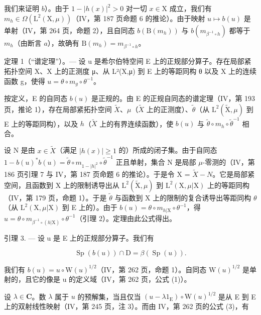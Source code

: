 我们来证明 \(b\)）。由于 \(1 - |h(x)|^2 > 0\) 对一切 \(x \in \mathrm{X}\) 成立，我们有 \(m_h \in \Omega(\mathrm{L}^2(\mathrm{X}, \mu))\)（IV，第 187 页命题 6 的推论）。由于映射 \(u \mapsto b(u)\) 是单射（IV，第 264 页，命题 2），且自同态 \(b(\mathrm{B}(m_h))\) 与 \(b(m_{\beta^{-1}\circ h})\) 都等于 \(m_h\)（由断言 \(a\)），故确有 \(\mathrm{B}(m_h) = m_{\beta^{-1}\circ h}\)。

定理 1（“谱定理”）。--- 设 u 是希尔伯特空间 E 上的正规部分算子。存在局部紧拓扑空间 X、X 上的正测度 μ、从 L²(X,μ) 到 E 上的等距同构 θ 以及 X 上的连续函数 g，使得 \(u = \theta \circ m_g \circ \theta^{-1}\)。

按定义，E 的自同态 \(b(u)\) 是正规的。由 E 的正规自同态的谱定理（IV，第 193 页，推论 1），存在局部紧拓扑空间 \(\widetilde{X}\)、\(\mu\)（\(\widetilde{X}\) 上的正测度）、\(\widetilde{\theta}\)（从 \(\mathrm{L}^2 (\widetilde{\mathrm{X}},\mu)\) 到 E 上的等距同构），以及 \(h\)（\(\widetilde{X}\) 上的有界连续函数），使 \(b(u)\) 与 \(\widetilde{\theta}\circ m_h\circ \widetilde{\theta}^{-1}\) 相合。

设 N 是由 \(x \in \widetilde{X}\)（满足 \(|h(x)| \geqslant 1\) 的）所成的闭子集。由于自同态 \(1 - b(u)^{*}b(u) = \widetilde{\theta} \circ m_{1-|h|^2} \circ \widetilde{\theta}^{-1}\) 正且单射，集合 N 是局部 \(\mu\)-零测的（IV，第 186 页引理 7 与 IV，第 187 页命题 6 的推论）。于是令 X = \(\widetilde{X} - N\)。它是局部紧空间，且函数到 X 上的限制诱导出从 \(\mathrm{L}^{2}(\widetilde{\mathrm{X}}, \mu)\) 到 \(\mathrm{L}^{2}(\mathrm{X}, \mu|\mathrm{X})\) 上的等距同构（IV，第 179 页，命题 1）。于是 \(\widetilde{\theta}\) 与函数到 X 上的限制的复合诱导出等距同构 \(\theta\)（从 \(\mathrm{L}^{2}(\mathrm{X}, \mu|\mathrm{X})\) 到 E 上的）。由于 \(b(u) = \theta \circ m_{h|\mathrm{X}} \circ \theta^{-1}\)，得 \(u = \theta \circ m_{\beta^{-1} \circ (h|\mathrm{X})} \circ \theta^{-1}\)（引理 2）。定理由此公式得出。

引理 3. --- 设 u 是 E 上的正规部分算子。我们有

\[
\operatorname{Sp} (b (u)) \cap \mathrm{D} = \beta (\operatorname{Sp} (u)).
\]

我们有 \(b(u) = u \circ \mathrm{W}(u)^{1/2}\)（IV，第 262 页，命题 1）。自同态 \(\mathrm{W}(u)^{1/2}\) 是单射的，且它的像是 u 的定义域（IV，第 262 页，公式 (1)）。

设 \(\lambda \in \mathbf{C}\)。数 \(\lambda\) 属于 \(u\) 的预解集，当且仅当 \((u - \lambda 1_{\mathrm{E}}) \circ \mathrm{W}(u)^{1/2}\) 是从 E 到 E 上的双射线性映射（IV，第 245 页，注 3）。而由 IV，第 262 页的公式 (3)，有

